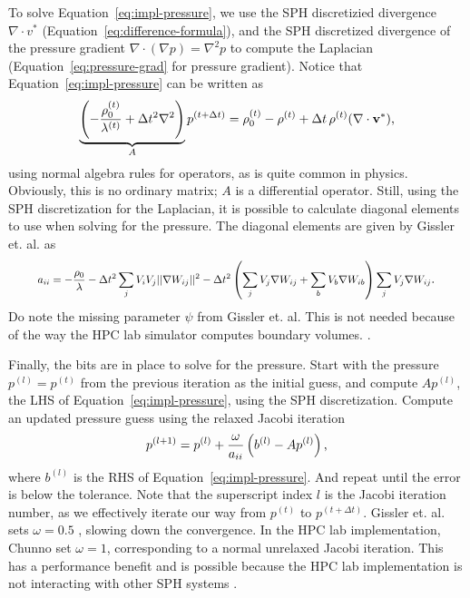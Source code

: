 To solve Equation~\ref{eq:impl-pressure}, we use the SPH discretizied divergence
$\nabla \cdot v^*$ (Equation~\ref{eq:difference-formula}), and the SPH discretized divergence of the pressure gradient
$\nabla \cdot (\nabla p) = \nabla^2 p$ to compute the Laplacian (Equation~\ref{eq:pressure-grad} for pressure gradient).
Notice that Equation~\ref{eq:impl-pressure} can be written as
\begin{equation*}
    \underbrace{\left(- \frac {\rho_0^{(t)}} {\lambda^{(t)}} + \Delta t^2 \nabla^2 \right)}_{A} p^{(t + \Delta t)}
    = \rho_0^{(t)} - \rho^{(t)} + \Delta t\, \rho^{(t)} (\nabla \cdot \vec v^*)
    \text,
\end{equation*}
using normal algebra rules for operators, as is quite common in physics.
Obviously, this is no ordinary matrix; $A$ is a differential operator.
Still, using the SPH discretization for the Laplacian, it is possible to 
calculate diagonal elements to use when solving for the pressure.
The diagonal elements are given by Gissler et. al. as
\begin{equation}
    \scalemath{0.85}{%
    a_{ii} = - \frac {\rho_0} \lambda - \Delta t^2 \sum_j V_i V_j ||\nabla W_{ij}||^2
             - \Delta t^2 \left(
                \sum_j V_j \nabla W_{ij} + \sum_b V_b \nabla W_{ib}
             \right) \sum_j V_j \nabla W_{ij}
    }
    \text.
\end{equation}
Do note the missing parameter $\psi$ from Gissler et. al. This is not needed because of
the way the HPC lab simulator computes boundary volumes.
\cite[p.~48]{chunnoo2022simulating}.

Finally, the bits are in place to solve for the pressure.
Start with the pressure $p^{(l)} = p^{(t)}$ from the previous iteration as the 
initial guess,
and compute $Ap^{(l)}$, the LHS of Equation~\ref{eq:impl-pressure},
using the SPH discretization.
Compute an updated pressure guess using the relaxed Jacobi iteration
\begin{equation*}
    p^{(l+1)} = p^{(l)} + \frac \omega {a_{ii}} \left(
    b^{(l)} - Ap^{(l)}
    \right)
    \text,
\end{equation*}
where $b^{(l)}$ is the RHS of Equation~\ref{eq:impl-pressure}.
And repeat until the error is below the tolerance.
Note that the superscript index $l$ is the Jacobi iteration number,
as we effectively iterate our way from $p^{(t)}$ to $p^{(t+\Delta t)}$.
Gissler et. al. sets $\omega = 0.5$ \cite{icsph}, slowing down the convergence.
In the HPC lab implementation, Chunno set $\omega = 1$,
corresponding to a normal unrelaxed Jacobi iteration.
This has a performance benefit and is possible because the HPC lab implementation
is not interacting with other SPH systems
\cite{chunnoo2022simulating}.


